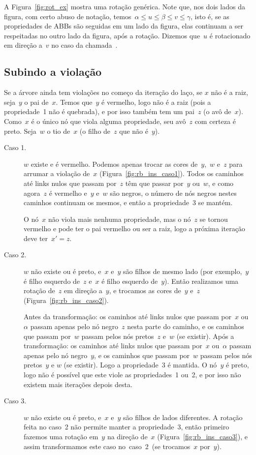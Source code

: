 \documentclass[main.tex]{subfiles}
\begin{document}
A Figura~\ref{fig:rot_ex} mostra uma rotação genérica. Note que, nos dois lados da figura, com certo abuso de notação, temos~${\alpha \leq u \leq \beta \leq v \leq \gamma}$, isto é, se as propriedades de ABBs são seguidas em um lado da figura, elas continuam a ser respeitadas no outro lado da figura, após a rotação. Dizemos que~$u$ é rotacionado em direção a~$v$ no caso da chamada~. %

\subsection{Subindo a violação}

Se a árvore ainda tem violações no começo da iteração do laço, se $x$ não é a raiz, seja~$y$ o pai de~$x$. Temos que~$y$ é vermelho, logo não é a raiz (pois a propriedade~1 não é quebrada), e por isso também tem um pai~$z$ (o avô de~$x$). Como~$x$ é o único nó que viola alguma propriedade, seu avô~$z$ com certeza é preto. Seja~$w$ o tio de~$x$ (o filho de~$z$ que não é~$y$).


\begin{description}
	\item[Caso 1.] $w$ existe e é vermelho. Podemos apenas trocar as cores de~$y$,~$w$ e~$z$ para arrumar a violação de~$x$ (Figura~\ref{fig:rb_ins_caso1}). Todos os caminhos até links nulos que passam por~$z$ têm que passar por~$y$ ou~$w$, e como agora~$z$ é vermelho e~$y$ e~$w$ são negros, o número de nós negros nestes caminhos continuam os mesmos, e então a propriedade~3 se mantém.

	O nó~$x$ não viola mais nenhuma propriedade, mas o nó~$z$ se tornou vermelho e pode ter o pai vermelho ou ser a raiz, logo a próxima iteração deve ter~$x' = z$.

	\item[Caso 2.] $w$ não existe ou é preto, e~$x$ e~$y$ são filhos de mesmo lado (por exemplo,~$y$ é filho esquerdo de~$z$ e~$x$ é filho esquerdo de~$y$). Então realizamos uma rotação de~$z$ em direção a~$y$, e trocamos as cores de~$y$ e~$z$ (Figura~\ref{fig:rb_ins_caso2}).

	Antes da transformação: os caminhos até links nulos que passam por~$x$ ou~$\alpha$ passam apenas pelo nó negro~$z$ nesta parte do caminho, e os caminhos que passam por~$w$ passam pelos nós pretos~$z$ e~$w$ (se existir). Após a transformação: os caminhos até links nulos que passam por~$x$ ou~$\alpha$ passam apenas pelo nó negro~$y$, e os caminhos que passam por~$w$ passam pelos nós pretos~$y$ e $w$ (se existir). Logo a propriedade~3 é mantida. O nó~$y$ é preto, logo não é possível que este viole as propriedades~1 ou~2, e por isso não existem mais iterações depois desta.

	\item[Caso 3.] $w$ não existe ou é preto, e~$x$ e~$y$ são filhos de lados diferentes. A rotação feita no caso~2 não permite manter a propriedade~3, então primeiro fazemos uma rotação em~$y$ na direção de~$x$ (Figura~\ref{fig:rb_ins_caso3}), e assim transformamos este caso no~caso~2~(se trocamos~$x$ por~$y$).

\end{description}
\end{document}
